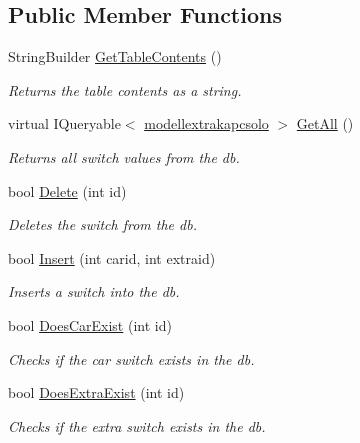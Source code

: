 \subsection*{Public Member Functions}
\begin{DoxyCompactItemize}
\item 
String\+Builder \mbox{\hyperlink{class_car_shop_1_1_repository_1_1_car_extra_keys_repository_af7db447bc763dddf4c0474559fae8619}{Get\+Table\+Contents}} ()
\begin{DoxyCompactList}\small\item\em Returns the table contents as a string. \end{DoxyCompactList}\item 
virtual I\+Queryable$<$ \mbox{\hyperlink{class_car_shop_1_1_data_1_1modellextrakapcsolo}{modellextrakapcsolo}} $>$ \mbox{\hyperlink{class_car_shop_1_1_repository_1_1_car_extra_keys_repository_ab2d1626c117c62d3126519c3fa700ab6}{Get\+All}} ()
\begin{DoxyCompactList}\small\item\em Returns all switch values from the db. \end{DoxyCompactList}\item 
bool \mbox{\hyperlink{class_car_shop_1_1_repository_1_1_car_extra_keys_repository_aaecebb3f3933fd328b4e8d7cf99e06e2}{Delete}} (int id)
\begin{DoxyCompactList}\small\item\em Deletes the switch from the db. \end{DoxyCompactList}\item 
bool \mbox{\hyperlink{class_car_shop_1_1_repository_1_1_car_extra_keys_repository_a2b68866de9559d8363b571e1dc79e877}{Insert}} (int carid, int extraid)
\begin{DoxyCompactList}\small\item\em Inserts a switch into the db. \end{DoxyCompactList}\item 
bool \mbox{\hyperlink{class_car_shop_1_1_repository_1_1_car_extra_keys_repository_ab05a8666dae9c172ad83dd8e1b6f0487}{Does\+Car\+Exist}} (int id)
\begin{DoxyCompactList}\small\item\em Checks if the car switch exists in the db. \end{DoxyCompactList}\item 
bool \mbox{\hyperlink{class_car_shop_1_1_repository_1_1_car_extra_keys_repository_a0b75f82c4df05804e0f217cb43d342c2}{Does\+Extra\+Exist}} (int id)
\begin{DoxyCompactList}\small\item\em Checks if the extra switch exists in the db. \end{DoxyCompactList}\end{DoxyCompactItemize}


